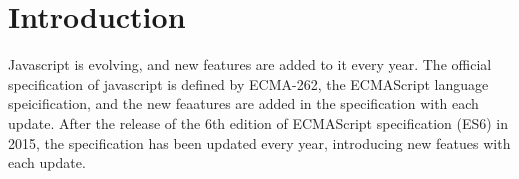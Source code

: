 \section{Introduction}
%
%
%

% 

%
%
%



Javascript is evolving, and new features are added to it every year.
The official specification of javascript is defined by ECMA-262, the ECMAScript language speicification,
and the new feaatures are added in the specification with each update.
After the release of the 6th edition of ECMAScript specification (ES6) in 2015,
the specification has been updated every year, introducing new featues with each update.


